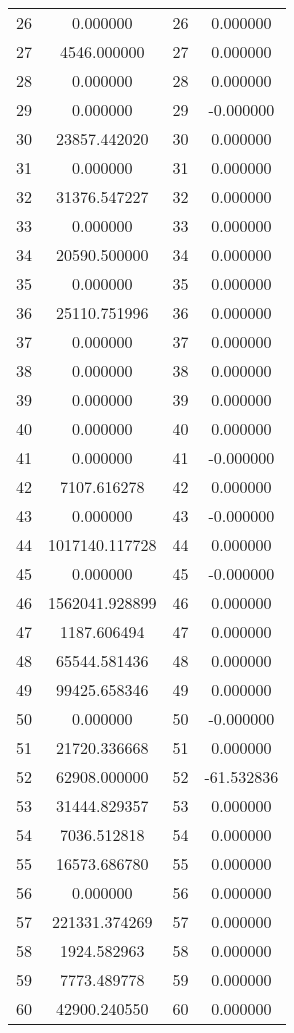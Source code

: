 \documentclass[12pt]{article}
\begin{document}
\begin{longtable}{@{}cccc@{}}
26 & 0.000000 & 26 & 0.000000 \\
27 & 4546.000000 & 27 & 0.000000 \\
28 & 0.000000 & 28 & 0.000000 \\
29 & 0.000000 & 29 & -0.000000 \\
30 & 23857.442020 & 30 & 0.000000 \\
31 & 0.000000 & 31 & 0.000000 \\
32 & 31376.547227 & 32 & 0.000000 \\
33 & 0.000000 & 33 & 0.000000 \\
34 & 20590.500000 & 34 & 0.000000 \\
35 & 0.000000 & 35 & 0.000000 \\
36 & 25110.751996 & 36 & 0.000000 \\
37 & 0.000000 & 37 & 0.000000 \\
38 & 0.000000 & 38 & 0.000000 \\
39 & 0.000000 & 39 & 0.000000 \\
40 & 0.000000 & 40 & 0.000000 \\
41 & 0.000000 & 41 & -0.000000 \\
42 & 7107.616278 & 42 & 0.000000 \\
43 & 0.000000 & 43 & -0.000000 \\
44 & 1017140.117728 & 44 & 0.000000 \\
45 & 0.000000 & 45 & -0.000000 \\
46 & 1562041.928899 & 46 & 0.000000 \\
47 & 1187.606494 & 47 & 0.000000 \\
48 & 65544.581436 & 48 & 0.000000 \\
49 & 99425.658346 & 49 & 0.000000 \\
50 & 0.000000 & 50 & -0.000000 \\
51 & 21720.336668 & 51 & 0.000000 \\
52 & 62908.000000 & 52 & -61.532836 \\
53 & 31444.829357 & 53 & 0.000000 \\
54 & 7036.512818 & 54 & 0.000000 \\
55 & 16573.686780 & 55 & 0.000000 \\
56 & 0.000000 & 56 & 0.000000 \\
57 & 221331.374269 & 57 & 0.000000 \\
58 & 1924.582963 & 58 & 0.000000 \\
59 & 7773.489778 & 59 & 0.000000 \\
60 & 42900.240550 & 60 & 0.000000 \\

\end{longtable}
\end{document}
